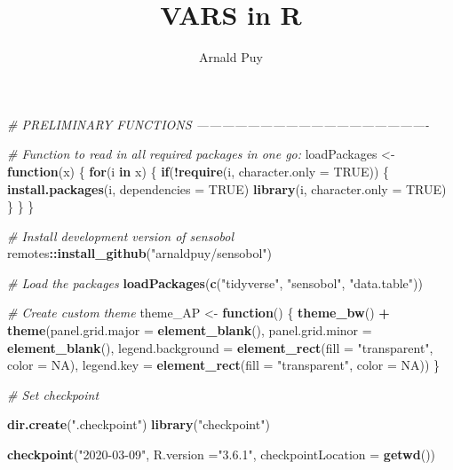 \documentclass[11pt,]{article}
\title{VARS in R}
\author{Arnald Puy}
\date{}
\newenvironment{Shaded}{\begin{snugshade}}{\end{snugshade}}
\newcommand{\CommentTok}[1]{\textcolor[rgb]{0.56,0.35,0.01}{\textit{#1}}}
\newcommand{\ControlFlowTok}[1]{\textcolor[rgb]{0.13,0.29,0.53}{\textbf{#1}}}
\newcommand{\DataTypeTok}[1]{\textcolor[rgb]{0.13,0.29,0.53}{#1}}
\newcommand{\KeywordTok}[1]{\textcolor[rgb]{0.13,0.29,0.53}{\textbf{#1}}}
\newcommand{\NormalTok}[1]{#1}
\newcommand{\OperatorTok}[1]{\textcolor[rgb]{0.81,0.36,0.00}{\textbf{#1}}}
\newcommand{\OtherTok}[1]{\textcolor[rgb]{0.56,0.35,0.01}{#1}}
\newcommand{\StringTok}[1]{\textcolor[rgb]{0.31,0.60,0.02}{#1}}
\begin{document}
\maketitle

\newpage

\begin{Shaded}
\begin{Highlighting}[]
\CommentTok{# PRELIMINARY FUNCTIONS -------------------------------------------------------}

\CommentTok{# Function to read in all required packages in one go:}
\NormalTok{loadPackages <-}\StringTok{ }\ControlFlowTok{function}\NormalTok{(x) \{}
  \ControlFlowTok{for}\NormalTok{(i }\ControlFlowTok{in}\NormalTok{ x) \{}
    \ControlFlowTok{if}\NormalTok{(}\OperatorTok{!}\KeywordTok{require}\NormalTok{(i, }\DataTypeTok{character.only =} \OtherTok{TRUE}\NormalTok{)) \{}
      \KeywordTok{install.packages}\NormalTok{(i, }\DataTypeTok{dependencies =} \OtherTok{TRUE}\NormalTok{)}
      \KeywordTok{library}\NormalTok{(i, }\DataTypeTok{character.only =} \OtherTok{TRUE}\NormalTok{)}
\NormalTok{    \}}
\NormalTok{  \}}
\NormalTok{\}}

\CommentTok{# Install development version of sensobol}
\NormalTok{remotes}\OperatorTok{::}\KeywordTok{install_github}\NormalTok{(}\StringTok{"arnaldpuy/sensobol"}\NormalTok{)}

\CommentTok{# Load the packages}
\KeywordTok{loadPackages}\NormalTok{(}\KeywordTok{c}\NormalTok{(}\StringTok{"tidyverse"}\NormalTok{, }\StringTok{"sensobol"}\NormalTok{, }\StringTok{"data.table"}\NormalTok{))}



\CommentTok{# Create custom theme}
\NormalTok{theme_AP <-}\StringTok{ }\ControlFlowTok{function}\NormalTok{() \{}
  \KeywordTok{theme_bw}\NormalTok{() }\OperatorTok{+}
\StringTok{    }\KeywordTok{theme}\NormalTok{(}\DataTypeTok{panel.grid.major =} \KeywordTok{element_blank}\NormalTok{(),}
          \DataTypeTok{panel.grid.minor =} \KeywordTok{element_blank}\NormalTok{(),}
          \DataTypeTok{legend.background =} \KeywordTok{element_rect}\NormalTok{(}\DataTypeTok{fill =} \StringTok{"transparent"}\NormalTok{,}
                                           \DataTypeTok{color =} \OtherTok{NA}\NormalTok{),}
          \DataTypeTok{legend.key =} \KeywordTok{element_rect}\NormalTok{(}\DataTypeTok{fill =} \StringTok{"transparent"}\NormalTok{,}
                                    \DataTypeTok{color =} \OtherTok{NA}\NormalTok{))}
\NormalTok{\}}

\CommentTok{# Set checkpoint}

\KeywordTok{dir.create}\NormalTok{(}\StringTok{".checkpoint"}\NormalTok{)}
\KeywordTok{library}\NormalTok{(}\StringTok{"checkpoint"}\NormalTok{)}

\KeywordTok{checkpoint}\NormalTok{(}\StringTok{"2020-03-09"}\NormalTok{, }
           \DataTypeTok{R.version =}\StringTok{"3.6.1"}\NormalTok{, }
           \DataTypeTok{checkpointLocation =} \KeywordTok{getwd}\NormalTok{())}
\end{Highlighting}
\end{Shaded}
\end{document}
